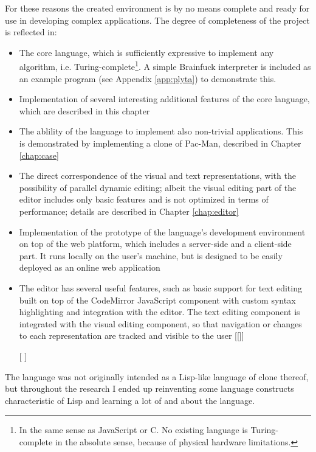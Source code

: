 For these reasons the created environment is by no means complete and ready for
use in developing complex applications. The degree of completeness of the
project is reflected in:
\begin{itemize}
    \item The core language, which is sufficiently expressive to implement any
      algorithm, i.e. Turing-complete\footnote{In the same sense as JavaScript or C. No existing language is Turing-complete in the absolute sense, because of physical hardware limitations.}. A simple Brainfuck interpreter is included as an example program (see Appendix \ref{app:plyta}) to demonstrate this\cite{bf_turing_complete}.   
    \item Implementation of several interesting additional features of the core
      language, which are described in this chapter 
    \item The ablility of the language to implement also non-trivial
      applications. This is demonstrated by implementing a clone of Pac-Man,
      described in Chapter \ref{chap:case}
    \item The direct correspondence of the visual and text representations, with
      the possibility of parallel dynamic editing; albeit the visual editing
      part of the editor includes only basic features and is not optimized in
      terms of performance; details are described in Chapter \ref{chap:editor}
    \item Implementation of the prototype of the language's development
      environment on top of the web platform, which includes a server-side and a
      client-side part. It runs locally on the user's machine, but is designed
      to be easily deployed as an online web application
    \item The editor has several useful features, such as basic support for text
      editing built on top of the CodeMirror JavaScript component with custom
      syntax highlighting and integration with the editor. The text editing
      component is integrated with the visual editing component, so that
      navigation or changes to each representation are tracked and visible to
      the user [[]]
    \item [[]]
\end{itemize}

The language was not originally intended as a Lisp-like language of clone
thereof, but throughout the research I ended up reinventing some language
constructs characteristic of Lisp and learning a lot of and about the language.

